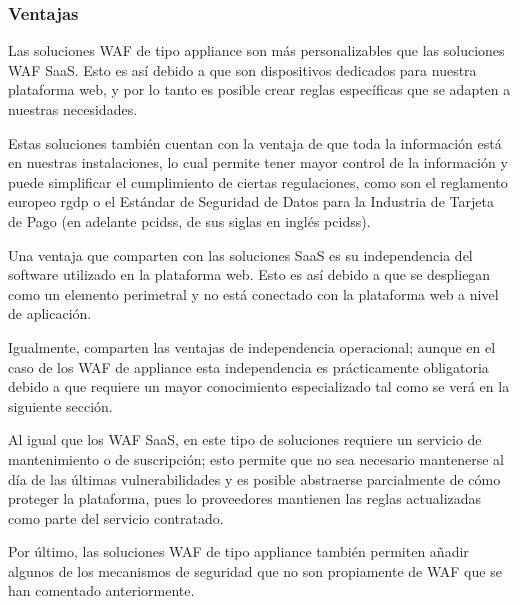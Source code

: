 \subsubsection{Ventajas}
\par Las soluciones WAF de tipo appliance son más personalizables que las soluciones WAF SaaS. Esto es así debido a que son 
dispositivos dedicados para nuestra plataforma web, y por lo tanto es posible crear reglas específicas que se adapten a nuestras necesidades.
\par Estas soluciones también cuentan con la ventaja de que toda la información está en nuestras instalaciones, lo cual permite tener mayor
control de la información y puede simplificar el cumplimiento de ciertas regulaciones, como son el reglamento europeo \acrshort{rgdp} o el
Estándar de Seguridad de Datos para la Industria de Tarjeta de Pago (en adelante \acrshort{pcidss}, de sus siglas en inglés \acrlong{pcidss}).
\par Una ventaja que comparten con las soluciones SaaS es su independencia del software utilizado en la plataforma web. Esto es así debido a
que se despliegan como un elemento perimetral y no está conectado con la plataforma web a nivel de aplicación.
\par Igualmente, comparten las ventajas de independencia operacional; aunque en el caso de los WAF de appliance esta independencia es
prácticamente obligatoria debido a que requiere un mayor conocimiento especializado tal como se verá en la siguiente sección.
\par Al igual que los WAF SaaS, en este tipo de soluciones requiere un servicio de mantenimiento o de suscripción; esto permite que no sea
necesario mantenerse al día de las últimas vulnerabilidades y es posible abstraerse parcialmente de cómo proteger la plataforma, pues lo
proveedores mantienen las reglas actualizadas como parte del servicio contratado.
\par Por último, las soluciones WAF de tipo appliance también permiten añadir algunos de los mecanismos de seguridad que no son propiamente
de WAF que se han comentado anteriormente.


